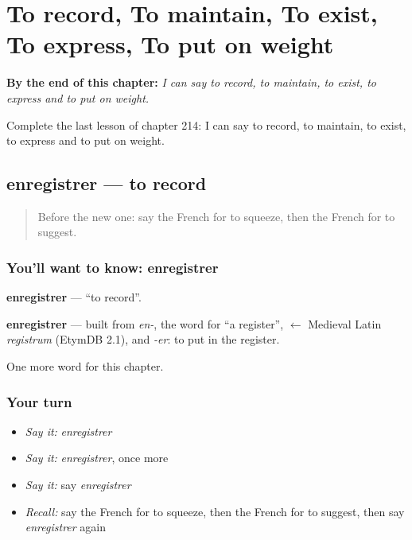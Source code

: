 
\chapter{To record, To maintain, To exist, To express, To put on weight}
\label{ch:fr-to-record-to-maintain-to-exist-to-express-to-put-on-weight}

\begin{chapteropening}
\textbf{By the end of this chapter:} \emph{I can say to record, to maintain, to exist, to express and to put on weight.}

Complete the last lesson of chapter 214: I can say to record, to maintain, to exist, to express and to put on weight.
\end{chapteropening}

\section[enregistrer]{enregistrer — to record}

\label{lesson:FR-C214-enregistrer}



\begin{quote}
Before the new one: say the French for to squeeze, then the French for to suggest.
\end{quote}

\subsection*{You'll want to know: enregistrer}
\textbf{enregistrer} — \textquotedblleft{}to record\textquotedblright{}.

\begin{cousinweb}
\textbf{enregistrer} — built from \emph{en-}, the word for \textquotedblleft{}a register\textquotedblright{}, $\leftarrow$ Medieval Latin \emph{registrum} (EtymDB 2.1), and \emph{-er}: to put in the register.
\end{cousinweb}

\begin{grammarlens}[title={What you've built}]
One more word for this chapter.
\end{grammarlens}

\subsection*{Your turn}
\begin{itemize}
\raggedright
  \item \emph{Say it:} \emph{enregistrer}
  \item \emph{Say it:} \emph{enregistrer}, once more
  \item \emph{Say it:} say \emph{enregistrer}
  \item \emph{Recall:} say the French for to squeeze, then the French for to suggest, then say \emph{enregistrer} again
\end{itemize}

